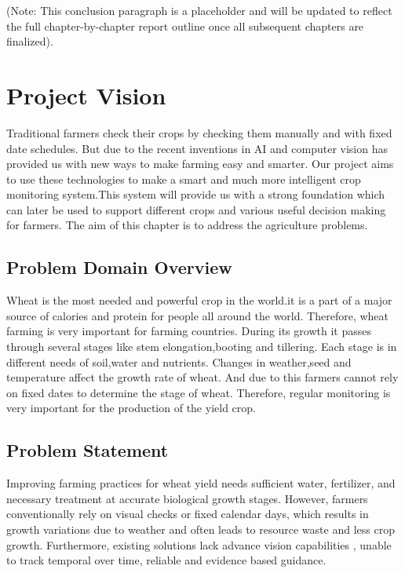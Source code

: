 \documentclass{FastFyp}
\begin{document}
(Note: This conclusion paragraph is a placeholder and will be updated to reflect the full chapter-by-chapter report outline once all subsequent chapters are finalized).

 
\chapter{Project Vision}
Traditional farmers check their crops by checking them manually and with fixed date schedules. But due to the recent inventions in AI and computer vision has provided us with new ways to make farming easy and smarter. Our project aims to use these technologies to make a smart and much more intelligent crop monitoring system.This system will provide us with a strong foundation which can later be used to support different crops and various useful decision making for farmers. The aim of this chapter is to address the agriculture problems. 
\section{Problem Domain Overview}
Wheat is the most needed and powerful crop in the world.it is a part of a major source of calories and protein for people all around the world. Therefore, wheat farming is very important for farming countries. During its growth it passes through several stages like stem elongation,booting and tillering. Each stage is in different needs of soil,water and nutrients. Changes in weather,seed and temperature affect the growth rate of wheat. And due to this farmers cannot rely on fixed dates to determine the stage of wheat. Therefore, regular monitoring is very important for the production of the yield crop. 
\section{Problem Statement}
Improving farming practices for wheat yield needs sufficient water, fertilizer, and necessary treatment at accurate biological growth stages. However, farmers conventionally rely on visual checks or fixed calendar days, which results in growth variations due to weather and often leads to resource waste and less crop growth. Furthermore, existing solutions lack advance vision capabilities , unable to track temporal over time, reliable and evidence based guidance.  
\end{document}
